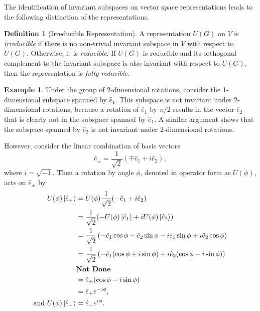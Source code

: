 \documentclass[12pt]{report}
\newcommand{\ehat}{\hat{e}}
\theoremstyle{definition}
\newtheorem{definition}{Definition}[chapter]
\newtheorem{example}{Example}[chapter]
\begin{document}
The identification of invariant subspaces on vector space representations leads to the following distinction of the representations.
\begin{definition}[Irreducible Representation]
    A representation $U(G)$ on $V$ is \textit{irreducible} if there is no non-trivial invariant subspace in $V$ with respect to $U(G)$. Otherwise, it is \textit{reducible}. If $U(G)$ is reducible and its orthogonal complement to the invariant subspace is also invariant with respect to $U(G)$, then the representation is \textit{fully reducible}.
    
\end{definition}

\begin{example}
    Under the group of 2-dimensional rotations, consider the 1-dimensional subspace spanned by $\ehat_1$. This subspace is not invariant under 2-dimensional rotations, because a rotation of $\ehat_1$ by $\pi/2$ results in the vector $\ehat_2$ that is clearly not in the subspace spanned by $\ehat_1$. A similar argument shows that the subspace spanned by $\ehat_2$ is not invariant under 2-dimensional rotations.

    However, consider the linear combination of basis vectors
    \begin{equation}
        \ehat_\pm = \frac{1}{\sqrt{2}}\left( \mp\ehat_1 + i\ehat_2 \right),
    \end{equation}
    where $i = \sqrt{-1}$. Then a rotation by angle $\phi$, denoted in operator form as $U(\phi)$, acts on $\ehat_\pm$ by
    \begin{align}
        U(\phi)\ket{\ehat_+} &= U(\phi)\frac{1}{\sqrt{2}}(-\ehat_1 + i\ehat_2) \\
        &= \frac{1}{\sqrt{2}}(-U(\phi)\ket{\ehat_1} + iU(\phi)\ket{\ehat_2}) \nonumber \\
        &= \frac{1}{\sqrt{2}}\left( -\ehat_1\cos\phi - \ehat_2\sin\phi -i\ehat_1\sin\phi + i\ehat_2\cos\phi \right) \nonumber \\
        &= \frac{1}{\sqrt{2}}\left( -\ehat_1(\cos\phi+ i\sin\phi) +i\ehat_2(\cos\phi-i\sin\phi) \right) \nonumber \\
        & \textbf{Not Done} \nonumber \\
        &= \ehat_+ (\cos\phi - i\sin\phi) \nonumber \\
        &= \ehat_+ e^{-i\phi}, \\
        \textrm{and } U(\phi)\ket{\ehat_-} &= \ehat_- e^{i\phi}.
    \end{align}

\end{example}
\end{document}

